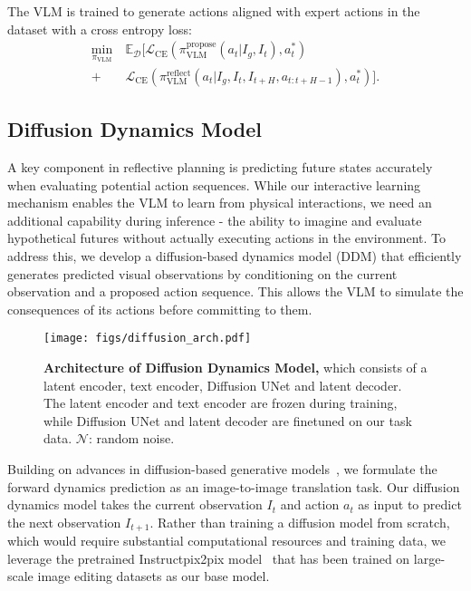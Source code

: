 The VLM is trained to generate actions aligned with expert actions in the dataset with a cross entropy loss:
\begin{equation}
\begin{split}
    \min_{\pi_\text{VLM}}\ & \mathbb{E}_{\mathcal{D}}\Big[\mathcal{L}_\text{CE}(\pi_\text{VLM}^\text{propose}(a_t|I_g, I_t), a_t^*) \\
   +\ & \mathcal{L}_\text{CE}(\pi_\text{VLM}^\text{reflect}(a_t|I_g, I_t, I_{t+H}, a_{t:t+H-1}), a_t^*)\Big]. %
\end{split}
\end{equation}


\subsection{Diffusion Dynamics Model}\label{sec:diffusion_model}
A key component in reflective planning is predicting future states accurately when evaluating potential action sequences. While our interactive learning mechanism enables the VLM to learn from physical interactions, we need an additional capability during inference - the ability to imagine and evaluate hypothetical futures without actually executing actions in the environment. To address this, we develop a diffusion-based dynamics model (DDM) that efficiently generates predicted visual observations by conditioning on the current observation and a proposed action sequence. This allows the VLM to simulate the consequences of its actions before committing to them.

\begin{figure}[h]
    \centering
    \texttt{[image: figs/diffusion\_arch.pdf]}
    \vspace{-0.2in}
    \caption{\textbf{Architecture of Diffusion Dynamics Model,} which consists of a latent encoder, text encoder, Diffusion UNet and latent decoder. The latent encoder and text encoder are frozen during training, while Diffusion UNet and latent decoder are finetuned on our task data. $\mathcal{N}$: random noise.}
    \label{fig:diffusion_model}
\end{figure}

Building on advances in diffusion-based generative models~\citep{rombach2021highresolution, ho2020ddpm, song2021score}, we formulate the forward dynamics prediction as an image-to-image translation task. Our diffusion dynamics model takes the current observation $I_t$ and action $a_t$ as input to predict the next observation $I_{t+1}$. Rather than training a diffusion model from scratch, which would require substantial computational resources and training data, we leverage the pretrained Instructpix2pix model~\citep{brooks2022instructpix2pix} that has been trained on large-scale image editing datasets as our base model.

